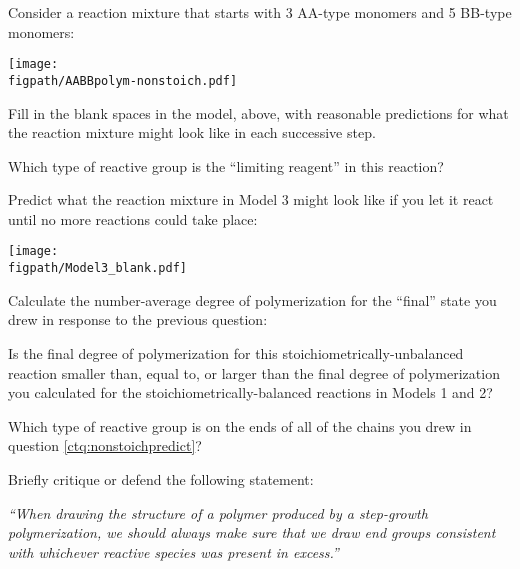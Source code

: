 \begin{activity}
\begin{model}
Consider a reaction mixture that starts with 3 AA-type monomers and 5 BB-type monomers:

\vspace{0.1in}
\centerline{\texttt{[image: \\figpath/AABBpolym-nonstoich.pdf]}}

\end{model}

\begin{ctqs}

		\question Fill in the blank spaces in the model, above, with reasonable predictions for what the reaction mixture might look like in each successive step.
		
		\question Which type of reactive group is the ``limiting reagent'' in this reaction?
		
		\question \label{ctq:nonstoichpredict} Predict what the reaction mixture in Model 3 might look like if you let it react until no more reactions could take place:
		
\vspace{0.1in}
\centerline{\texttt{[image: \\figpath/Model3\_blank.pdf]}}
		
		\question Calculate the number-average degree of polymerization for the ``final'' state you drew in response to the previous question:
		
		\vspace{1in}
		
		\question Is the final degree of polymerization for this stoichiometrically-unbalanced reaction smaller than, equal to, or larger than the final degree of polymerization you calculated for the stoichiometrically-balanced reactions in Models 1 and 2?
		
		\vspace{0.5in}
		
		\question Which type of reactive group is on the ends of all of the chains you drew in question \ref{ctq:nonstoichpredict}?
		
		\vspace{0.5in}
		
		\question Briefly critique or defend the following statement:
		
			\emph{``When drawing the structure of a polymer produced by a step-growth polymerization, we should always make sure that we draw end groups consistent with whichever reactive species was present in excess.''}
		
		\vspace{1in}
			

\end{ctqs}
\end{activity}
